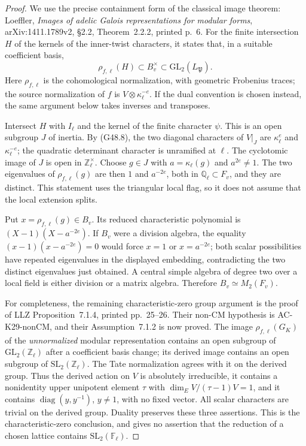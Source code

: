 \begin{proof}
We use the precise containment form of the classical image theorem:
Loeffler, \emph{Images of adelic Galois representations for modular
forms}, arXiv:1411.1789v2, \S2.2, Theorem~2.2.2, printed p.~6.
For the finite intersection $H$ of the kernels of the inner-twist
characters, it states that, in a suitable coefficient basis,
\[
                  \rho_{f,\ell}(H)\subset B_v^\times
                  \subset\mathrm{GL}_2(L_{\mathfrak P}).
                                                        \tag{CUE.1}
\]
Here $\rho_{f,\ell}$ is the cohomological normalization, with
geometric Frobenius traces; the source normalization of $f$ is
$V\otimes\kappa_\ell^{-e}$.  If the dual convention is chosen
instead, the same argument below takes inverses and transposes.

Intersect $H$ with $I_\ell$ and the kernel of the finite character
$\psi$.  This is an open subgroup $J$ of inertia.  By (G48.8),
the two diagonal characters of $V|_J$ are
$\kappa_\ell^e$ and $\kappa_\ell^{-e}$; the quadratic determinant
character is unramified at $\ell$.  The cyclotomic image of $J$
is open in $\mathbb Z_\ell^\times$.  Choose $g\in J$ with
$a=\kappa_\ell(g)$ and $a^{2e}\ne1$.
The two eigenvalues of $\rho_{f,\ell}(g)$ are then
$1$ and $a^{-2e}$, both in $\mathbb Q_\ell\subset F_v$, and
they are distinct.  This statement uses the triangular local
flag, so it does not assume that the local extension splits.

Put $x=\rho_{f,\ell}(g)\in B_v$.  Its reduced characteristic
polynomial is $(X-1)(X-a^{-2e})$.  If $B_v$ were a division
algebra, the equality
$(x-1)(x-a^{-2e})=0$ would force $x=1$ or $x=a^{-2e}$;
both scalar possibilities have repeated eigenvalues in the displayed
embedding, contradicting the two distinct eigenvalues just obtained.  A central simple algebra of degree
two over a local field is either division or a matrix algebra.
Therefore $B_v\simeq M_2(F_v)$.

For completeness, the remaining characteristic-zero group argument
is the proof of LLZ Proposition~7.1.4, printed pp.~25--26.
Their non-CM hypothesis is AC-K29-nonCM, and their Assumption~7.1.2
is now proved.  The image $\rho_{f,\ell}(G_K)$ of the
\emph{unnormalized} modular representation contains an open subgroup
of $\mathrm{GL}_2(\mathbb Z_\ell)$ after a coefficient basis change;
its derived image contains an open subgroup of
$\mathrm{SL}_2(\mathbb Z_\ell)$.  The Tate normalization agrees
with it on the derived group.  Thus the derived action on $V$ is absolutely
irreducible, it contains a nonidentity upper unipotent element
$\tau$ with $\dim_E V/(\tau-1)V=1$, and it contains
$\operatorname{diag}(y,y^{-1})$, $y\ne1$, with no fixed vector.
All scalar characters are trivial on the derived group.
Duality preserves these three assertions.  This is the
characteristic-zero conclusion, and gives no assertion that
the reduction of a chosen lattice contains
$\mathrm{SL}_2(\mathbb F_\ell)$.
\end{proof}

